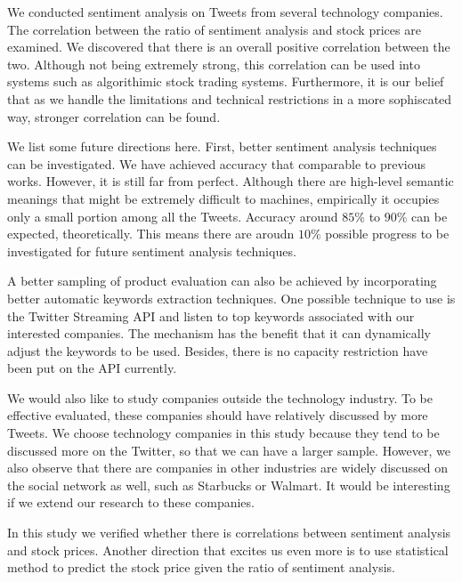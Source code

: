 \documentclass[12pt]{article}
\begin{document}
We conducted sentiment analysis on Tweets from several technology companies. The correlation between the ratio of sentiment analysis and stock prices are examined. We discovered that there is an overall positive correlation between the two. Although not being extremely strong, this correlation can be used into systems such as algorithimic stock trading systems. Furthermore, it is our belief that as we handle the limitations and technical restrictions in a more sophiscated way, stronger correlation can be found.

We list some future directions here. First, better sentiment analysis techniques can be investigated. We have achieved accuracy that comparable to previous works. However, it is still far from perfect. Although there are high-level semantic meanings that might be extremely difficult to machines, empirically it occupies only a small portion among all the Tweets. Accuracy around $85\%$ to $90\%$ can be expected, theoretically. This means there are aroudn $10\%$ possible progress to be investigated for future sentiment analysis techniques.

A better sampling of product evaluation can also be achieved by incorporating better automatic keywords extraction techniques. One possible technique to use is the Twitter Streaming API \cite{TwtStrAPI} and listen to top keywords associated with our interested companies. The mechanism has the benefit that it can dynamically adjust the keywords to be used. Besides, there is no capacity restriction have been put on the API currently.

We would also like to study companies outside the technology industry. To be effective evaluated, these companies should have relatively discussed by more Tweets. We choose technology companies in this study because they tend to be discussed more on the Twitter, so that we can have a larger sample. However, we also observe that there are companies in other industries are widely discussed on the social network as well, such as Starbucks or Walmart. It would be interesting if we extend our research to these companies.

In this study we verified whether there is correlations between sentiment analysis and stock prices. Another direction that excites us even more is to use statistical method to predict the stock price given the ratio of sentiment analysis.



\end{document}
